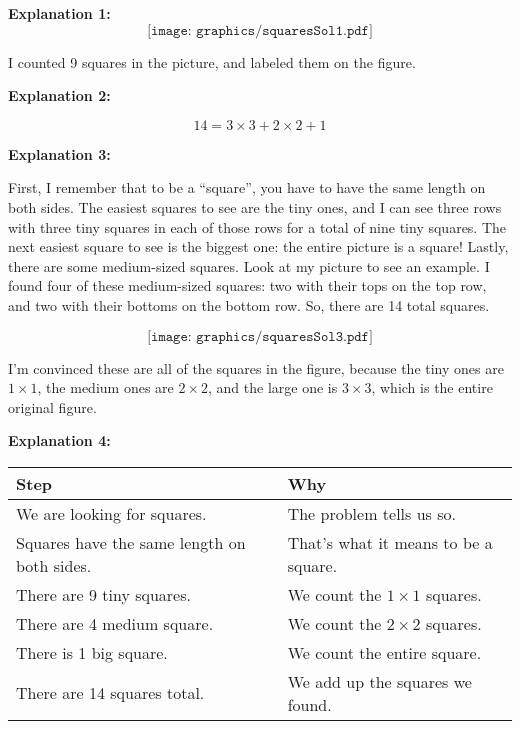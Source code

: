 \documentclass{ximera}
\begin{document}
\newpage


\parbox{2.5in}{
\begin{mdframed}

{\bf Explanation 1:}
\[
\texttt{[image: graphics/squaresSol1.pdf]}
\]

I counted 9 squares in the picture, and labeled them on the figure.

\end{mdframed}}
\parbox{2in}{
\begin{mdframed}
{\bf Explanation 2:}

$$ 14 = 3\times 3 + 2\times 2 + 1 $$


\end{mdframed}}

\begin{mdframed}
{\bf Explanation 3:}

First, I remember that to be a ``square'', you have to have the same length on both sides.  The easiest squares to see are the tiny ones, and I can see three rows with three tiny squares in each of those rows for a total of nine tiny squares.  The next easiest square to see is the biggest one: the entire picture is a square!  Lastly, there are some medium-sized squares.  Look at my picture to see an example.  I found four of these medium-sized squares: two with their tops on the top row, and two with their bottoms on the bottom row.  So, there are 14 total squares.

\[
\texttt{[image: graphics/squaresSol3.pdf]}
\]

I'm convinced these are all of the squares in the figure, because the tiny ones are $1\times 1$, the medium ones are $2 \times 2$, and the large one is $3\times 3$, which is the entire original figure.
\end{mdframed}

\begin{mdframed}
{\bf Explanation 4:}

\begin{tabularx}{\textwidth}{X|X}
    Step & Why  \\ \hline \hline
    We are looking for squares. & The problem tells us so. \\ \hline
    Squares have the same length on both sides. & That's what it means to be a square. \\ \hline
    There are 9 tiny squares. & We count the $1\times 1$ squares. \\ \hline
    There are 4 medium square. & We count the $2 \times 2$ squares. \\ \hline
    There is 1 big square. & We count the entire square. \\ \hline
    There are 14 squares total. & We add up the squares we found. \\
\end{tabularx}
\end{mdframed}
\end{document}
